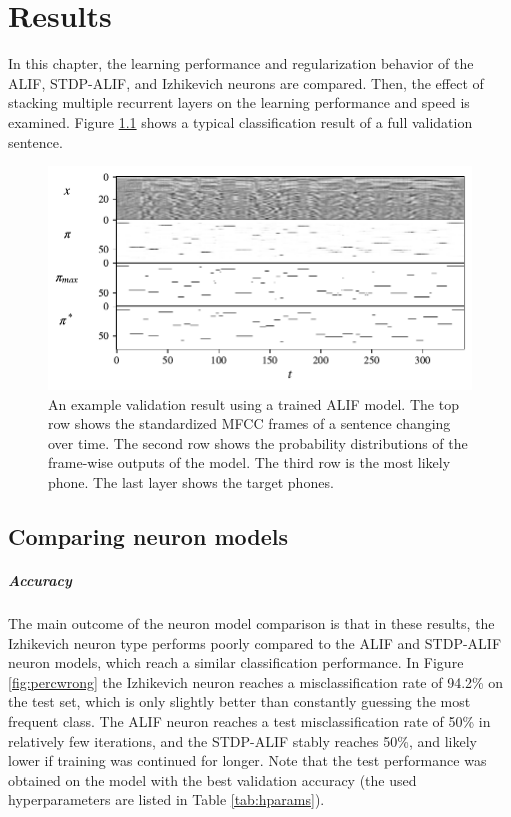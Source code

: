 \chapter{Results}\label{ch:results}
In this chapter, the learning performance and regularization behavior of the ALIF, STDP-ALIF, and Izhikevich neurons are compared.
Then, the effect of stacking multiple recurrent layers on the learning performance and speed is examined.
Figure \ref{fig:inoutpair} shows a typical classification result of a full validation sentence.

	\begin{figure}[ht]
	    \myfloatalign
	    \includegraphics[width=\linewidth]{gfx/InOutPair}
	    \caption[Input-output-target example.]{An example validation result using a trained ALIF model. The top row shows the standardized MFCC frames of a sentence changing over time. The second row shows the probability distributions of the frame-wise outputs of the model. The third row is the most likely phone. The last layer shows the target phones.}
	    \label{fig:inoutpair}
	  \end{figure}

\section{Comparing neur{}on models}
	\paragraph{Accuracy}
		The main outcome of the neuron model comparison is that in these results, the Izhikevich neuron type performs poorly compared to the ALIF and STDP-ALIF neuron models, which reach a similar classification performance.
		In Figure \ref{fig:percwrong} the Izhikevich neuron reaches a misclassification rate of 94.2\% on the test set, which is only slightly better than constantly guessing the most frequent class.
		The ALIF neuron reaches a test misclassification rate of 50\% in relatively few iterations, and the STDP-ALIF stably reaches 50\%, and likely lower if training was continued for longer.
		Note that the test performance was obtained on the model with the best validation accuracy (the used hyperparameters are listed in Table \ref{tab:hparams}).

